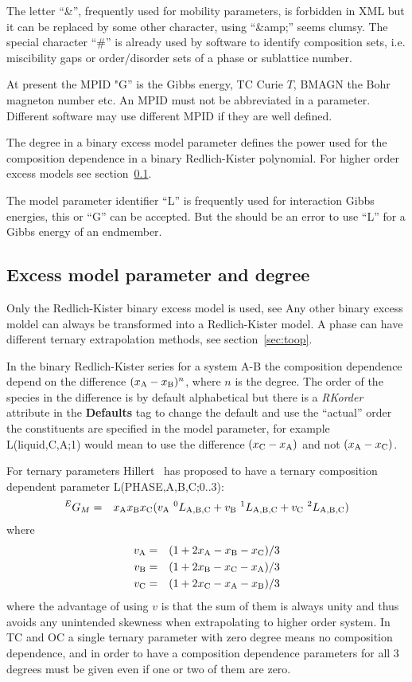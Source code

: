 \documentclass{article}
\begin{document}
The letter ``\&'', frequently used for mobility parameters, is
forbidden in XML but it can be replaced by some other character, using
``\&amp;'' seems clumsy.  The special character ``\#'' is already used
by software to identify composition sets, i.e. miscibility gaps or
order/disorder sets of a phase or sublattice number.

At present the MPID "G'' is the Gibbs energy, TC Curie $T$, BMAGN the
Bohr magneton number etc.  An MPID must not be abbreviated in a
parameter.  Different software may use different MPID if they are well
defined.

The degree in a binary excess model parameter defines the power used
for the composition dependence in a binary Redlich-Kister polynomial.
For higher order excess models see section~\ref{sec:degree}.

The model parameter identifier ``L'' is frequently used for
interaction Gibbs energies, this or ``G'' can be accepted.  But the
should be an error to use ``L'' for a Gibbs energy of an endmember.

\subsection{Excess model parameter and degree}\label{sec:degree}\label{sec:rkorder}

Only the Redlich-Kister binary excess model is used, see Any other
binary excess moldel can always be transformed into a Redlich-Kister
model.  A phase can have different ternary extrapolation methods, see
section~\ref{sec:toop}.

In the binary Redlich-Kister series for a system A-B the composition
dependence depend on the difference $(x_{\rm A}-x_{\rm B})^n$, where
$n$ is the degree.  The order of the species in the difference is by
default alphabetical but there is a {\em RKorder} attribute in the
{\bf Defaults} tag to change the default and use the ``actual'' order
the constituents are specified in the model parameter, for example
L(liquid,C,A;1) would mean to use the difference $(x_{\rm C}-x_{\rm
  A})$ and not $(x_{\rm A}-x_{\rm C})$.

For ternary parameters Hillert~\cite{80Hil} has proposed
to have a ternary composition dependent parameter L(PHASE,A,B,C;0..3):
\begin{eqnarray}
^EG_M &=& x_{\rm A}x_{\rm B}x_{\rm C}(v_{\rm A}~^0L_{\rm A,B,C}+v_{\rm B}~^1L_{\rm A,B,C}+v_{\rm C}~^2L_{\rm A,B,C}) \label{eq:hillert3}
\end{eqnarray}
where
\begin{eqnarray}
v_{\rm A} &=& (1+2x_{\rm A}-x_{\rm B}-x_{\rm C})/3\\
v_{\rm B} &=& (1+2x_{\rm B}-x_{\rm C}-x_{\rm A})/3\\
v_{\rm C} &=& (1+2x_{\rm C}-x_{\rm A}-x_{\rm B})/3
\end{eqnarray}
where the advantage of using $v$ is that the sum of them is always
unity and thus avoids any unintended skewness when extrapolating to
higher order system.  In TC and OC a single ternary parameter with
zero degree means no composition dependence, and in order to have a
composition dependence parameters for all 3 degrees must be given even
if one or two of them are zero.
\end{document}
